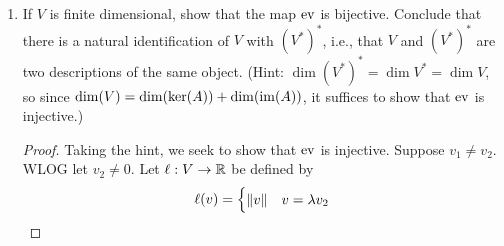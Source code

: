\documentclass[../psets.tex]{subfiles}
\begin{document}
\begin{enumerate}[label={\textbf{1.2.\roman*.}}]
\begin{enumerate}
\begin{proof}
\begin{align*}
                    \eva_v(\lambda\ell) &= (\lambda\ell)(v)\\
                &= \ell_1(v)+\ell_2(v)&
                    &= \lambda\ell(v)\\
                &= \eva_v(\ell_1)+\eva_v(\ell_2)&
                    &= \lambda\eva_v(\ell)
            \end{align*}
            so $\eva_v$ is linear, as desired.\par
            Let $v_1,v_2,v\in V$, $\ell\in V^*$, and $\lambda\in\R$ be arbitrary. Then
            \begin{align*}
                \eva(v_1+v_2)(\ell) &= \eva_{v_1+v_2}(\ell)&
                    \eva(\lambda v)(\ell) &= \eva_{\lambda v}(\ell)\\
                &= \ell(v_1+v_2)&
                    &= \ell(\lambda v)\\
                &= \ell(v_1)+\ell(v_2)&
                    &= \lambda\ell(v)\\
                &= \eva_{v_1}(\ell)+\eva_{v_2}(\ell)&
                    &= \lambda\eva_v(\ell)\\
                &= \eva(v_1)(\ell)+\eva(v_2)(\ell)&
                    &= \lambda\eva(v)(\ell)\\
                &= [\eva(v_1)+\eva(v_2)](\ell)&
                    &= [\lambda\eva(v)](\ell)
            \end{align*}
            Thus, $\eva(v_1+v_2)$ and $\eva(v_1)+\eva(v_2)$, and $\eva(\lambda v)$ and $\lambda\eva(v)$ have the same action pairwise on every $\ell\in V^*$. Consequently, the two pairs of functions in $V^*$ are both equal pairwise. Therefore, $\eva$ itself is linear.
        \end{proof}
        \item If $V$ is finite dimensional, show that the map $\eva$ is bijective. Conclude that there is a natural identification of $V$ with $(V^*)^*$, i.e., that $V$ and $(V^*)^*$ are two descriptions of the same object. (Hint: $\dim(V^*)^*=\dim V^*=\dim V$, so since $\dim(V)=\dim(\ker(A))+\dim(\operatorname{im}(A))$, it suffices to show that $\eva$ is injective.)
        \begin{proof}
            Taking the hint, we seek to show that $\eva$ is injective. Suppose $v_1\neq v_2$. WLOG let $v_2\neq 0$. Let $\ell:V\to\mathbb{R}$ be defined by
            \begin{equation*}
                \ell(v) =
                \begin{cases}
                    \norm{v} & v=\lambda v_2\\

\end{cases}
\end{equation*}
\end{proof}
\end{enumerate}
\end{enumerate}
\end{document}

